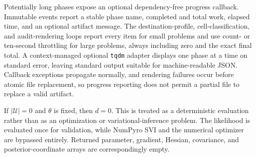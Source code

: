 Potentially long phases expose an optional dependency-free progress callback.
Immutable events report a stable phase name, completed and total work, elapsed
time, and an optional artifact message.  The destination-profile,
cell-classification, and audit-rendering loops report every item for small
problems and use count- or ten-second throttling for large problems, always
including zero and the exact final total.  A context-managed optional
\texttt{tqdm} adapter displays one phase at a time on standard error, leaving
standard output suitable for machine-readable JSON.  Callback exceptions
propagate normally, and rendering failures occur before atomic file replacement,
so progress reporting does not permit a partial file to replace a valid
artifact.

If $|\mathcal U|=0$ and $\theta$ is fixed, then $d=0$. This is treated as a
deterministic evaluation rather than as an optimization or variational-inference
problem. The likelihood is evaluated once for validation, while NumPyro SVI and
the numerical optimizer are bypassed entirely. Returned parameter, gradient,
Hessian, covariance, and posterior-coordinate arrays are correspondingly empty.

